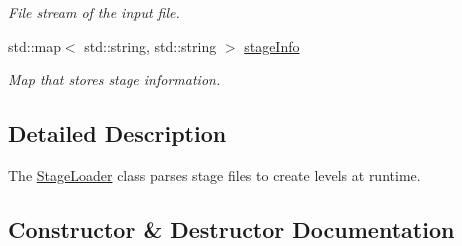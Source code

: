\begin{DoxyCompactItemize}
\begin{DoxyCompactList}\small\item\em File stream of the input file. \end{DoxyCompactList}\item 
std\+::map$<$ std\+::string, std\+::string $>$ \hyperlink{class_stage_loader_a53604a9fc34a15e90a13abbc9813297a}{stage\+Info}\hypertarget{class_stage_loader_a53604a9fc34a15e90a13abbc9813297a}{}\label{class_stage_loader_a53604a9fc34a15e90a13abbc9813297a}

\begin{DoxyCompactList}\small\item\em Map that stores stage information. \end{DoxyCompactList}\end{DoxyCompactItemize}


\subsection{Detailed Description}
The \hyperlink{class_stage_loader}{Stage\+Loader} class parses stage files to create levels at runtime. 

\subsection{Constructor \& Destructor Documentation}
